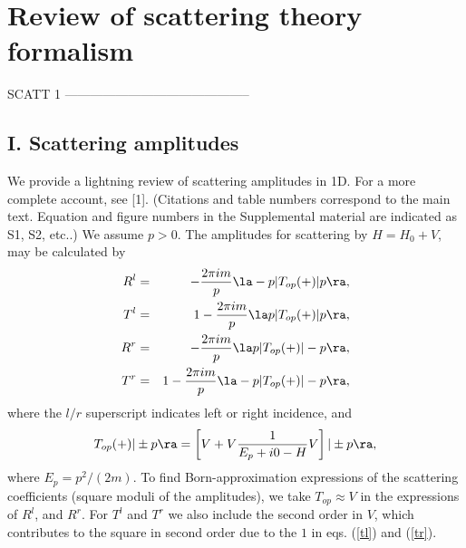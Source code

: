 
\chapter{Review of scattering theory formalism}
\label{Appendix:ScattFormalism}

%

SCATT 1
--------------------------------------------

\section{I. Scattering amplitudes\label{sa}}
%
We provide a lightning review of scattering amplitudes in 1D. For a more complete account, see [1].
(Citations and table numbers correspond to the main text. Equation and figure numbers in the Supplemental
material are indicated as S1, S2, etc..)
We assume $p>0$. The amplitudes for scattering by $H=H_0+V$, may be calculated by
\begin{eqnarray}
R^l&=&-\frac{2\pi i m}{p}\la -p|T_{op}(+)|p\ra,
\\
T^l&=&1-\frac{2\pi i m}{p} \la p|T_{op}(+)|p\ra,
\label{tl}
\\
R^r&=&-\frac{2\pi i m}{p}\la p|T_{op}(+)|-p\ra,
\\
T^r&=&1-\frac{2\pi i m}{p}\la -p|T_{op}(+)|-p\ra,
\label{tr}
\end{eqnarray}
%
where the $l/r$ superscript indicates left or right incidence, and
%
\begin{equation}
T_{op}(+)|\pm p\ra=\left[V+V\frac{1}{E_p+i0-H}V\right]|\pm p\ra,
\end{equation}
%
where $E_p=p^2/(2m)$.
To find Born-approximation expressions of the scattering coefficients (square moduli of the amplitudes), we take $T_{op}\approx V$ in the expressions of $R^l$, and $R^r$.
For $T^l$ and $T^r$ we also include the second order in $V$, which contributes to the square in
second order due to the $1$ in eqs. (\ref{tl}) and (\ref{tr}).



